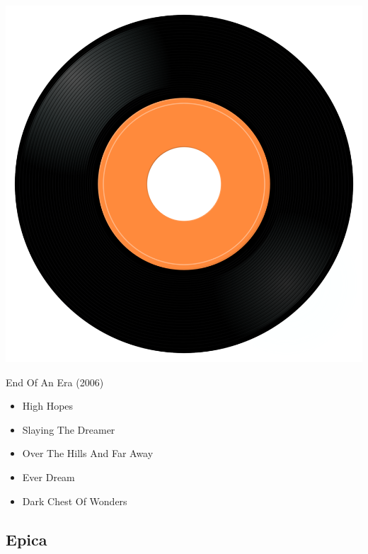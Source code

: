\begin{minipage}[t]{0.25\textwidth}
\captionsetup{type=figure}
\includegraphics[width=\textwidth]{Images/cover.png}
\caption*{End Of An Era (2006)}
\end{minipage}
\begin{minipage}[t]{0.25\textwidth}\vspace{0pt}
\begin{itemize}[nosep,leftmargin=1em,labelwidth=*,align=left]
	\setlength{\itemsep}{0pt}
	\item High Hopes
	\item Slaying The Dreamer
	\item Over The Hills And Far Away
	\item Ever Dream 
	\item Dark Chest Of Wonders
\end{itemize}
\end{minipage}

\subsection{Epica}

